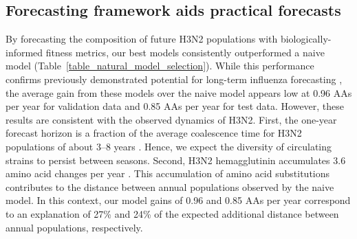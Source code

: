 \documentclass[9pt,lineno]{elife} %
\providecommand{\DIFaddbegin}{} %
\providecommand{\DIFaddend}{} %
\providecommand{\DIFdelbegin}{} %
\providecommand{\DIFdelend}{} %
\providecommand{\DIFaddbegin}{} %
\providecommand{\DIFaddend}{} %
\providecommand{\DIFdelbegin}{} %
\providecommand{\DIFdelend}{} %
\newcommand{\DIFscaledelfig}{0.5}
\newlength{\DIFdelgraphicswidth} %
\newlength{\DIFdelgraphicsheight} %
\newcommand{\DIFaddincludegraphics}[2][]{{\color{blue}\fbox{\DIFOincludegraphics[#1]{#2}}}} %
\newcommand{\DIFdelincludegraphics}[2][]{%
\sbox{\DIFdelgraphicsbox}{\DIFOincludegraphics[#1]{#2}}%
\settoboxwidth{\DIFdelgraphicswidth}{\DIFdelgraphicsbox} %
\settoboxtotalheight{\DIFdelgraphicsheight}{\DIFdelgraphicsbox} %
\scalebox{\DIFscaledelfig}{%
\parbox[b]{\DIFdelgraphicswidth}{\usebox{\DIFdelgraphicsbox}\\[-\baselineskip] \rule{\DIFdelgraphicswidth}{0em}}\llap{\resizebox{\DIFdelgraphicswidth}{\DIFdelgraphicsheight}{%
\setlength{\unitlength}{\DIFdelgraphicswidth}%
\begin{picture}(1,1)%
\thicklines\linethickness{2pt} %
{\color[rgb]{1,0,0}\put(0,0){\framebox(1,1){}}}%
{\color[rgb]{1,0,0}\put(0,0){\line( 1,1){1}}}%
{\color[rgb]{1,0,0}\put(0,1){\line(1,-1){1}}}%
\end{picture}%
}\hspace*{3pt}}} %
} %
\DeclareRobustCommand{\DIFaddbegin}{\DIFOaddbegin \let\includegraphics\DIFaddincludegraphics} %
\DeclareRobustCommand{\DIFaddend}{\DIFOaddend \let\includegraphics\DIFOincludegraphics} %
\DeclareRobustCommand{\DIFdelbegin}{\DIFOdelbegin \let\includegraphics\DIFdelincludegraphics} %
\DeclareRobustCommand{\DIFdelend}{\DIFOaddend \let\includegraphics\DIFOincludegraphics} %
\begin{document}
\subsection*{Forecasting framework aids practical forecasts}

By forecasting the composition of future H3N2 populations with biologically-informed fitness metrics, our best models consistently outperformed a naive model (Table~\ref{table_natural_model_selection}).
While this performance confirms previously demonstrated potential for long-term influenza forecasting \DIFdelbegin %
\DIFdelend \DIFaddbegin \citep{Luksza:2014hj}\DIFaddend , the average gain from these models over the naive model appears low at 0.96 AAs per year for validation data and 0.85 AAs per year for test data.
However, these results are consistent with the observed dynamics of H3N2.
First, the one-year forecast horizon is a fraction of the average coalescence time for H3N2 populations of about 3--8 years \DIFdelbegin %
\DIFdelend \DIFaddbegin \citep{Rambaut:2008ew}\DIFaddend .
Hence, we expect the diversity of circulating strains to persist between seasons.
Second, H3N2 hemagglutinin accumulates 3.6 amino acid changes per year \DIFdelbegin %
\DIFdelend \DIFaddbegin \citep{Smith:2004jc}\DIFaddend .
This accumulation of amino acid substitutions contributes to the distance between annual populations observed by the naive model.
In this context, our model gains of 0.96 and 0.85 AAs per year correspond to an explanation of 27\% and 24\% of the expected additional distance between annual populations, respectively.
\end{document}

